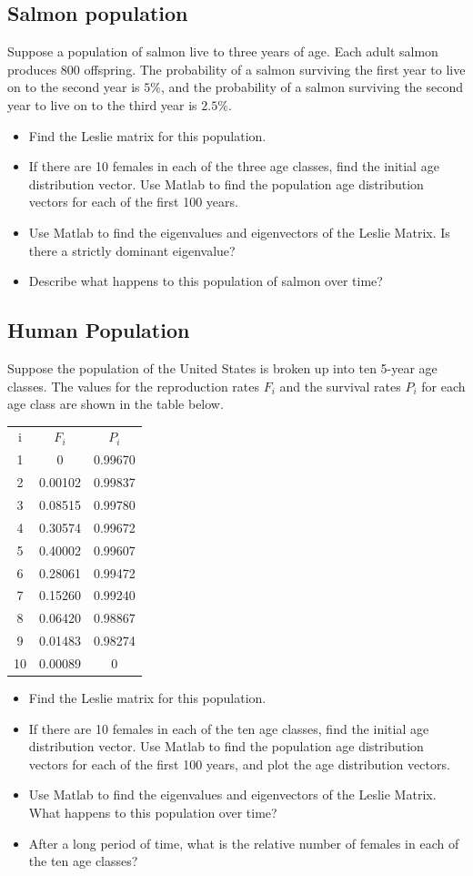 \subsection{Salmon population}
Suppose a population of salmon live to three years of age. Each adult salmon produces 800 offspring. The
probability of a salmon surviving the first year to live on to the second year is $5\%$, and the probability of a
salmon surviving the second year to live on to the third year is $2.5\%$.
\begin{itemize}
\item Find the Leslie matrix for this population.
\item If there are 10 females in each of the three age classes, find the initial age distribution vector. Use Matlab
to find the population age distribution vectors for each of the first 100 years.
\item Use Matlab to find the eigenvalues and eigenvectors of the Leslie Matrix. Is there a strictly dominant eigenvalue?
\item Describe what happens to this population of salmon over time?
\end{itemize}

\subsection{Human Population}
Suppose the population of the United States is broken up into ten 5-year age classes. The values for the
reproduction rates $F_i$ and the survival rates $P_i$ for each age class are shown in the table below.


\begin{tabular}{ccc}
i &$F_i$ & $P_i$\\
1 & 0 & 0.99670\\
2 &0.00102 &0.99837\\
3 &0.08515 &0.99780\\
4 &0.30574 &0.99672\\
5 &0.40002 &0.99607\\
6 &0.28061 &0.99472\\
7 &0.15260 &0.99240\\
8 &0.06420 &0.98867\\
9 &0.01483 &0.98274\\
10 &0.00089 &0
\end{tabular}
\begin{itemize}
\item Find the Leslie matrix for this population.
\item  If there are 10 females in each of the ten age classes, find the initial age distribution vector. Use Matlab to
find the population age distribution vectors for each of the first 100 years, and plot the age distribution
vectors.
\item  Use Matlab to find the eigenvalues and eigenvectors of the Leslie Matrix. What happens to this population
over time?
\item  After a long period of time, what is the relative number of females in each of the ten age classes?
\end{itemize}

